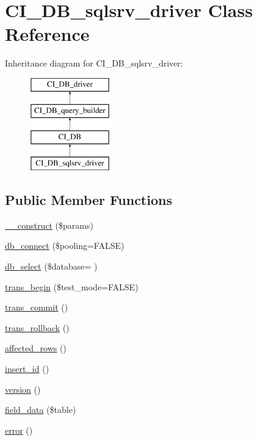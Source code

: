 \hypertarget{class_c_i___d_b__sqlsrv__driver}{}\section{C\+I\+\_\+\+D\+B\+\_\+sqlsrv\+\_\+driver Class Reference}
\label{class_c_i___d_b__sqlsrv__driver}
Inheritance diagram for C\+I\+\_\+\+D\+B\+\_\+sqlsrv\+\_\+driver\+:\begin{figure}[H]
\begin{center}
\leavevmode
\includegraphics[height=4.000000cm]{class_c_i___d_b__sqlsrv__driver}
\end{center}
\end{figure}
\subsection*{Public Member Functions}
\begin{DoxyCompactItemize}
\item 
\hyperlink{class_c_i___d_b__sqlsrv__driver_a9162320adff1a1a4afd7f2372f753a3e}{\+\_\+\+\_\+construct} (\$params)
\item 
\hyperlink{class_c_i___d_b__sqlsrv__driver_a6d26c8c9642181bd1124a45342f669f7}{db\+\_\+connect} (\$pooling=F\+A\+L\+S\+E)
\item 
\hyperlink{class_c_i___d_b__sqlsrv__driver_a0f25caba4648e1a5ec88fcfe767d5f12}{db\+\_\+select} (\$database= \textquotesingle{}\textquotesingle{})
\item 
\hyperlink{class_c_i___d_b__sqlsrv__driver_a90e153cf190d273336d77cce930587e1}{trans\+\_\+begin} (\$test\+\_\+mode=F\+A\+L\+S\+E)
\item 
\hyperlink{class_c_i___d_b__sqlsrv__driver_af4fbdcdace4aa94a139b64877601fe9b}{trans\+\_\+commit} ()
\item 
\hyperlink{class_c_i___d_b__sqlsrv__driver_a53f76d4dfcd6ac04fb653982442aeef8}{trans\+\_\+rollback} ()
\item 
\hyperlink{class_c_i___d_b__sqlsrv__driver_a77248aaad33eb132c04cc4aa3f4bc8cb}{affected\+\_\+rows} ()
\item 
\hyperlink{class_c_i___d_b__sqlsrv__driver_a933f2cde8dc7f87875e257d0a4902e99}{insert\+\_\+id} ()
\item 
\hyperlink{class_c_i___d_b__sqlsrv__driver_a6080dae0886626b9a4cedb29240708b1}{version} ()
\item 
\hyperlink{class_c_i___d_b__sqlsrv__driver_a90355121e1ed009e0efdbd544ab56efa}{field\+\_\+data} (\$table)
\item 
\hyperlink{class_c_i___d_b__sqlsrv__driver_a43b8d30b879d4f09ceb059b02af2bc02}{error} ()
\end{DoxyCompactItemize}

